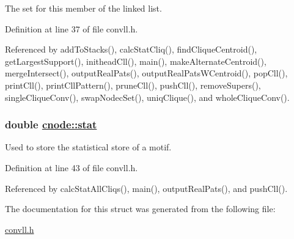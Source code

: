 The set for this member of the linked list. 

Definition at line 37 of file convll.h.

Referenced by add\-To\-Stacks(), calc\-Stat\-Cliq(), find\-Clique\-Centroid(), get\-Largest\-Support(), inithead\-Cll(), main(), make\-Alternate\-Centroid(), merge\-Intersect(), output\-Real\-Pats(), output\-Real\-Pats\-WCentroid(), pop\-Cll(), print\-Cll(), print\-Cll\-Pattern(), prune\-Cll(), push\-Cll(), remove\-Supers(), single\-Clique\-Conv(), swap\-Nodec\-Set(), uniq\-Clique(), and whole\-Clique\-Conv().\hypertarget{structcnode_o4}{
\subsubsection[stat]{\setlength{\rightskip}{0pt plus 5cm}double \hyperlink{structcnode_o4}{cnode::stat}}}
\label{structcnode_o4}


Used to store the statistical store of a motif. 

Definition at line 43 of file convll.h.

Referenced by calc\-Stat\-All\-Cliqs(), main(), output\-Real\-Pats(), and push\-Cll().

The documentation for this struct was generated from the following file:\begin{CompactItemize}
\item 
\hyperlink{convll_8h}{convll.h}\end{CompactItemize}
